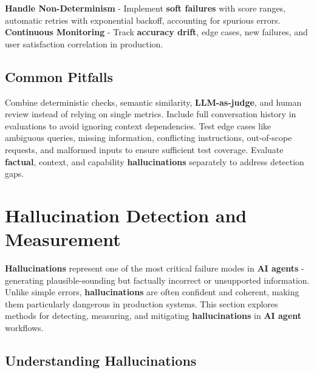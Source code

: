 \begin{TNtwocol}
{\textbf{Handle Non-Determinism}} - Implement \textbf{soft failures} with score ranges, automatic retries with exponential backoff, accounting for spurious errors.
{\textbf{Continuous Monitoring}} - Track \textbf{accuracy drift}, edge cases, new failures, and user satisfaction correlation in production.

\subsection*{Common Pitfalls}

Combine deterministic checks, semantic similarity, \textbf{LLM-as-judge}, and human review instead of relying on single metrics. Include full conversation history in evaluations to avoid ignoring context dependencies. Test edge cases like ambiguous queries, missing information, conflicting instructions, out-of-scope requests, and malformed inputs to ensure sufficient test coverage. Evaluate \textbf{factual}, context, and capability \textbf{hallucinations} separately to address detection gaps.

\section{Hallucination Detection and Measurement}


\textbf{Hallucinations} represent one of the most critical failure modes in \textbf{AI agents} - generating plausible-sounding but factually incorrect or unsupported information. Unlike simple errors, \textbf{hallucinations} are often confident and coherent, making them particularly dangerous in production systems. This section explores methods for detecting, measuring, and mitigating \textbf{hallucinations} in \textbf{AI agent} workflows.

\subsection*{Understanding Hallucinations}


\end{TNtwocol}
